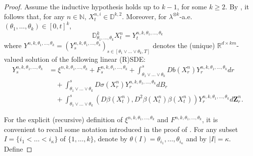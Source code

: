 \documentclass[11pt,a4paper]{article}
\newcommand{\R}{\mathbb{R}}
\theoremstyle{plain}
\begin{document}
\begin{proof}
  Assume the inductive hypothesis holds up to $k - 1$, for some $k \ge 2$.
  By \cite[Theorem 2.2.2]{nualart2006malliavin}, it follows that, for any $n \in \mathbb{N}$, $X^{n,i}_t \in \mathbb{D}^{k, 2}$. Moreover, for $\lambda^{\otimes k}$-a.e.\ $(\theta_1,\dots,\theta_k) \in [0,t]^k$,  $$\mathbb{D}^k_{\theta_1,\dots,\theta_k}X_t^n=Y_t^{n,k,\theta_1,\dots,\theta_k}$$ where $Y^{n,k,\theta_1,\dots,\theta_k}=(Y_s^{n,k,\theta_1,\dots,\theta_k})_{s\in [\theta_1\vee\dots\vee\theta_k,T]}$ denotes the (unique) $\R^{d \times km}$-valued solution of the following linear (R)SDE: \begin{align*}
    \label{eq:linear kth RSDE} Y_s^{n,k, \theta_1, \ldots, \theta_k} & = 
    \xi^{n,k, \theta_1, \ldots, \theta_k} + F_s^{n,k, \theta_1, \ldots, \theta_k}
    + \int_{\theta_1 \vee \ldots \vee \theta_k}^s  Db(X^n_r) Y_r^{n,k,
    \theta_1, \ldots, \theta_k} d r \\
    &\quad +   \int_{\theta_1 \vee \ldots \vee \theta_k}^s D \sigma (X^n_r) Y_r^{n,k,
    \theta_1, \ldots, \theta_k} d B_r  \\
    &\quad + \int_{\theta_1 \vee \dots \vee \theta_k}^s (D \beta (X^n_t), D^2
    \beta (X^n_t) \beta (X^n_t)) Y_r^{n,k, \theta_1, \ldots, \theta_k} d
    \mathbf{Z}^n_r . 
  \end{align*}
  {
  For the explicit (recursive) definition of $\xi^{n,k, \theta_1, \ldots, \theta_k}$ and $F^{n,k, \theta_1, \ldots, \theta_k}$, it is convenient to recall some notation introduced in the proof of \cite[Theorem 2.2.2]{nualart2006malliavin}. 
  For any subset \linebreak $I=\{i_1 < \dots < i_\kappa\}$ of $\{1,\dots,k\}$, denote by $\theta(I)=\theta_{i_1}, \dots, \theta_{i_\kappa}$ and by $|I| = \kappa$. 
  Define 
  
}
\end{proof}
\end{document}
